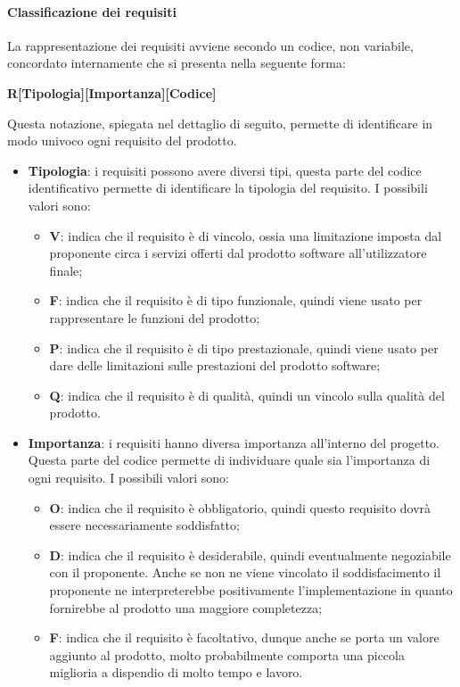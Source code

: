 \paragraph{Classificazione dei requisiti}
La rappresentazione dei requisiti avviene secondo un codice, non variabile, concordato internamente che si presenta nella seguente forma:

\begin{center}
    \textbf{R[Tipologia][Importanza][Codice]}
\end{center}

Questa notazione, spiegata nel dettaglio di seguito, permette di identificare in modo univoco ogni requisito del prodotto.
\begin{itemize}
    \item \textbf{Tipologia}: i requisiti possono avere diversi tipi, questa parte del codice identificativo permette di 
    identificare la tipologia del requisito. I possibili valori sono:
    \begin{itemize}
        \item \textbf{V}: indica che il requisito è di vincolo, ossia una limitazione imposta dal 
        proponente circa i servizi offerti dal prodotto software all'utilizzatore finale;
        \item \textbf{F}: indica che il requisito è di tipo funzionale, quindi viene usato per 
        rappresentare le funzioni del prodotto;
        \item \textbf{P}: indica che il requisito è di tipo prestazionale, quindi viene usato per dare 
        delle limitazioni sulle prestazioni del prodotto software;
        \item \textbf{Q}: indica che il requisito è di qualità, quindi un vincolo sulla qualità del prodotto.
    \end{itemize}
    
    \item \textbf{Importanza}: i requisiti hanno diversa importanza all'interno del progetto. Questa parte del codice 
    permette di individuare quale sia l'importanza di ogni requisito. I possibili valori sono:
    \begin{itemize}
        \item \textbf{O}: indica che il requisito è obbligatorio, quindi questo requisito dovrà essere necessariamente 
        soddisfatto;
        \item \textbf{D}: indica che il requisito è desiderabile, quindi eventualmente negoziabile con il proponente. 
        Anche se non ne viene vincolato il soddisfacimento il proponente ne interpreterebbe positivamente 
        l'implementazione in quanto fornirebbe al prodotto una maggiore completezza;
        \item \textbf{F}: indica che il requisito è facoltativo, dunque anche se porta un valore aggiunto al prodotto, 
        molto probabilmente comporta una piccola miglioria a dispendio di molto tempo e lavoro.
    \end{itemize}
    

\end{itemize}
